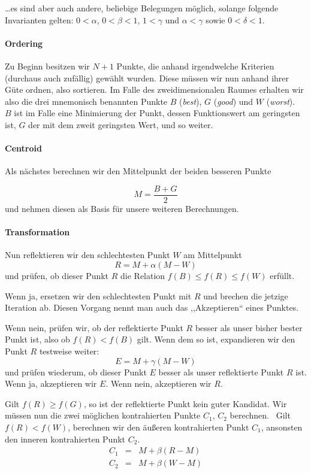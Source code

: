 \documentclass[naustrian]{article}
\begin{document}
\dots es sind aber auch andere, beliebige Belegungen möglich, solange
folgende Invarianten gelten: $0 < \alpha$, $0 < \beta < 1$, $1 < \gamma$ und $\alpha < \gamma$
sowie $0 < \delta < 1$.~\cite{nelder-mead-scholarpedia}

\paragraph{Ordering}

Zu Beginn besitzen wir $N+1$ Punkte, die anhand irgendwelche Kriterien
(durchaus auch zufällig) gewählt wurden. Diese müssen wir nun anhand
ihrer Güte ordnen, also sortieren. Im Falle des zweidimensionalen
Raumes erhalten wir also die drei mnemonisch benannten Punkte \textbf{$B$
}(\emph{best}), $G$ (\emph{good}) und $W$ (\emph{worst}).~\cite{nelder-mead-unknown} $B$ ist
im Falle eine Minimierung der Punkt, dessen Funktionswert am geringsten
ist, $G$ der mit dem zweit geringsten Wert, und so weiter.


\paragraph{Centroid}

Als nächstes berechnen wir den Mittelpunkt der beiden besseren Punkte

\[
    M=\frac{B+G}{2}
\]
und nehmen diesen als Basis für unsere weiteren Berechnungen.


\paragraph{Transformation}

Nun reflektieren wir den schlechtesten Punkt $W$ am Mittelpunkt
\[
    R=M+\alpha(M-W)
\]
und prüfen, ob dieser Punkt $R$ die Relation $f(B)\leq f(R)\leq f(W)$
erfüllt.

Wenn ja, ersetzen wir den schlechtesten Punkt mit $R$ und brechen
die jetzige Iteration ab. Diesen Vorgang nennt man auch das ,,Akzeptieren``
eines Punktes.

Wenn nein, prüfen wir, ob der reflektierte Punkt $R$ besser als unser
bisher bester Punkt ist, also ob $f(R)<f(B)$ gilt. Wenn dem so ist,
expandieren wir den Punkt $R$ testweise weiter:
\[
    E=M+\gamma(M-W)
\]
und prüfen wiederum, ob dieser Punkt $E$ besser als unser reflektierte
Punkt $R$ ist. Wenn ja, akzeptieren wir $E$. Wenn nein, akzeptieren
wir $R$.

Gilt $f(R)\geq f(G)$, so ist der reflektierte Punkt kein guter Kandidat.  Wir
müssen nun die zwei möglichen kontrahierten
Punkte $C_{1}$, $C_{2}$
berechnen.~\cite{nelder-mead-scholarpedia}\cite{nelder-mead-unknown} Gilt $f(R)<f(W)$, berechnen wir den
äußeren kontrahierten Punkt $C_{1}$, ansonsten den inneren kontrahierten Punkt
$C_{2}.$
\begin{eqnarray*}
    C_{1} & = & M+\beta(R-M)\\
    C_{2} & = & M+\beta(W-M)
\end{eqnarray*}
\end{document}
